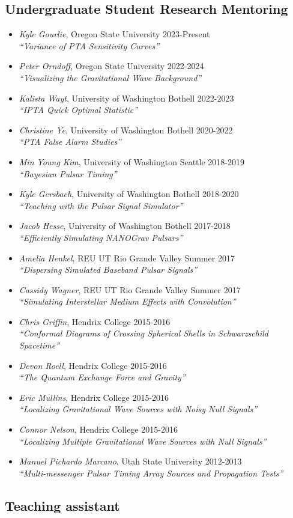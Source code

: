 \documentclass[11pt,letterpaper,sans,unicode]{moderncv}
\newcommand{\studentitem}[4]{\item \textit{#1}, {#2} \hfill{#3} \\ \textit{``#4''} } %
\newcommand{\blucirc}{{\color{color1} $\circ\;\;$}}
\begin{document}
\subsection{Undergraduate Student Research Mentoring}
\renewcommand\labelitemi{\blucirc}
\begin{itemize}[leftmargin=8mm]
	\studentitem{Kyle Gourlie}{Oregon State University}{2023-Present}{Variance of PTA Sensitivity Curves}
	\studentitem{Peter Orndoff}{Oregon State University}{2022-2024}{Visualizing the Gravitational Wave Background}
	\studentitem{Kalista Wayt}{University of Washington Bothell}{2022-2023}{IPTA Quick Optimal Statistic}
	\studentitem{Christine Ye}{University of Washington Bothell}{2020-2022}{PTA False Alarm Studies}
	\studentitem{Min Young Kim}{University of Washington Seattle}{2018-2019}{Bayesian Pulsar Timing}
	\studentitem{Kyle Gersbach}{University of Washington Bothell}{2018-2020}{Teaching with the Pulsar Signal Simulator}
	\studentitem{Jacob Hesse}{University of Washington Bothell}{2017-2018}{Efficiently Simulating NANOGrav Pulsars}
	\studentitem{Amelia Henkel}{REU UT Rio Grande Valley}{Summer 2017}{Dispersing Simulated Baseband Pulsar Signals}
	\studentitem{Cassidy Wagner}{REU UT Rio Grande Valley}{Summer 2017}{Simulating Interstellar Medium Effects with Convolution}
       	 \studentitem{Chris Griffin}{Hendrix College}{2015-2016}{Conformal Diagrams of Crossing Spherical Shells in Schwarzschild Spacetime}
      	\studentitem{Devon Roell}{Hendrix College}{2015-2016}{The Quantum Exchange Force and Gravity}
	\studentitem{Eric Mullins}{Hendrix College}{2015-2016}{Localizing Gravitational Wave Sources with Noisy Null Signals}
	\studentitem{Connor Nelson}{Hendrix College}{2015-2016}{Localizing Multiple Gravitational Wave Sources with Null Signals}
        	\studentitem{Manuel Pichardo Marcano}{Utah State University}{2012-2013}{Multi-messenger Pulsar Timing Array Sources and Propagation Tests}
\end{itemize}

\subsection{Teaching assistant}
\end{document}
